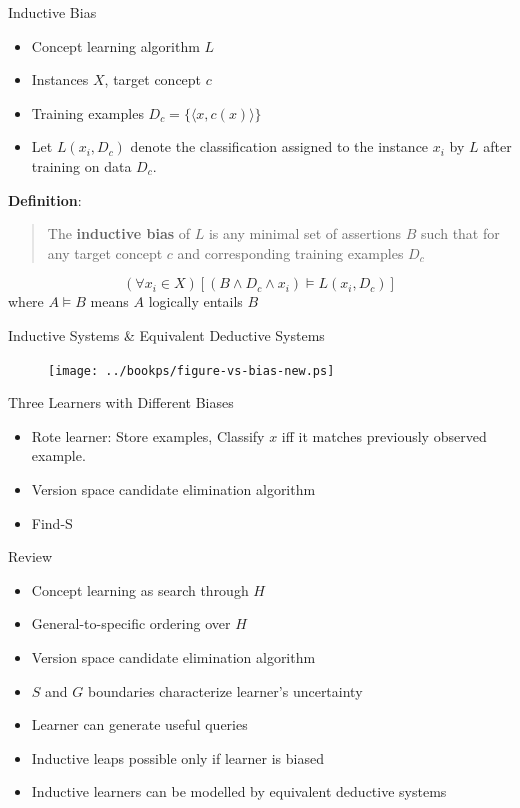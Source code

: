\documentclass[%
pdf,
colorBG,
slideColor,
tcrico,
]{prosper}
\begin{document}
\begin{slide}{Inductive Bias}
\small
\begin{itemize}
	\item Concept learning algorithm $L$ 
	\item Instances $X$, target concept $c$
	\item Training examples  $D_c = \{\langle x, c(x) \rangle \}$
	\item Let $L(x_i,D_c)$ denote the classification assigned to the instance $x_i$ by $L$ after training on data $D_c$.
\end{itemize}

{\bf Definition}:  
\begin{quote}The {\bf inductive bias}
of $L$ is any minimal set of assertions $B$ such that for any target concept
$c$ and corresponding training examples $D_c$
\end{quote}

\[
(\forall x_i \in X) [(B \wedge D_c \wedge x_i) \models L(x_i,D_c)]
\]
where $A \models B$ means $A$ logically entails $B$
\end{slide}


\begin{slide}{Inductive Systems \& Equivalent Deductive Systems}
\begin{figure}
	\centering
	\texttt{[image: ../bookps/figure-vs-bias-new.ps]}
\end{figure}
\end{slide}

\begin{slide}{Three Learners with Different Biases}
\begin{itemize}
\item Rote learner: Store examples, Classify $x$ iff it matches previously
observed example.
\item Version space candidate elimination algorithm
\item Find-S
\end{itemize}
\end{slide}


\begin{slide}{Review}
\begin{itemize}
\item Concept learning as search through $H$
\item General-to-specific ordering over $H$
\item Version space candidate elimination algorithm
\item $S$ and $G$ boundaries characterize learner's uncertainty
\item Learner can generate useful queries
\item Inductive leaps possible only if learner is biased
\item Inductive learners can be modelled by equivalent deductive systems
\end{itemize}
\end{slide}
\end{document}
